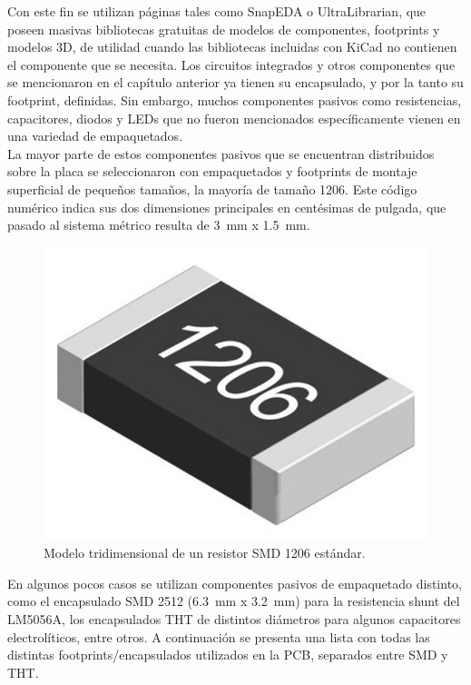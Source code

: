Con este fin se utilizan páginas tales como SnapEDA o UltraLibrarian, que poseen masivas bibliotecas gratuitas de modelos de componentes, footprints y modelos 3D, de utilidad cuando las bibliotecas incluidas con KiCad no contienen el componente que se necesita. Los circuitos integrados y otros componentes que se mencionaron en el capítulo anterior ya tienen su encapsulado, y por la tanto su footprint, definidas. Sin embargo, muchos componentes pasivos como resistencias, capacitores, diodos y LEDs que no fueron mencionados específicamente vienen en una variedad de empaquetados.\\

La mayor parte de estos componentes pasivos que se encuentran distribuidos sobre la placa se seleccionaron con empaquetados y footprints de montaje superficial de pequeños tamaños, la mayoría de tamaño 1206. Este código numérico indica sus dos dimensiones principales en centésimas de pulgada, que pasado al sistema métrico resulta de \SI[]{3}{\milli\meter} x \SI[]{1.5}{\milli\meter}.\\

\begin{figure}[h]
    \centering
    \includegraphics[scale=0.4]{Imagenes/1206.jpg}
    \caption{Modelo tridimensional de un resistor SMD 1206 estándar.}
    \label{smd1206}
\end{figure}

En algunos pocos casos se utilizan componentes pasivos de empaquetado distinto, como el encapsulado SMD 2512 (\SI[]{6.3}{\milli\meter} x \SI[]{3.2}{\milli\meter}) para la resistencia shunt del LM5056A, los encapsulados THT de distintos diámetros para algunos capacitores electrolíticos, entre otros. A continuación se presenta una lista con todas las distintas footprints/encapsulados utilizados en la PCB, separados entre SMD y THT.\\

